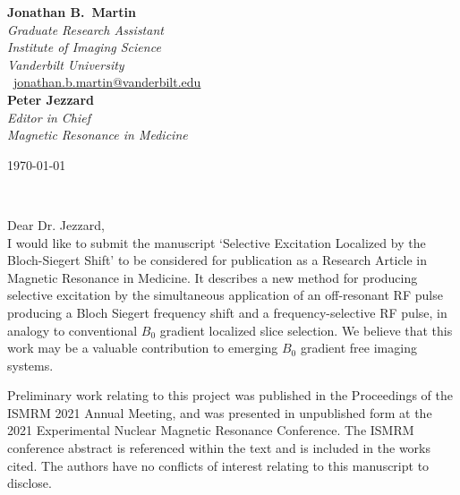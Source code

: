 \documentclass[11pt]{article}
\def\firstname{Jonathan B.}
\def\familyname{Martin}
\begin{document}
\sffamily   %
\raggedright%
{\bfseries \firstname~\familyname}\\[.35ex]
\small{\itshape%
Graduate Research Assistant\\
Institute of Imaging Science\\
Vanderbilt University\\}
\Letter~\href{mailto:jonathan.b.martin@vanderbilt.edu}{jonathan.b.martin@vanderbilt.edu}\\[2em]
{\bfseries Peter Jezzard}\\[.35ex]
\small{\itshape
Editor in Chief\\
Magnetic Resonance in Medicine\\[1em]}
%
\large
\hfill\begin{minipage}[t]{\textwidth} %
\raggedleft %
\today
\end{minipage}\\[2em]
\raggedright
Dear Dr. Jezzard,\\[1.5em]
%
I would like to submit the manuscript `Selective Excitation Localized by the Bloch-Siegert Shift' to be considered
for publication as a Research Article in Magnetic Resonance in Medicine. It describes a new method for producing selective excitation by the simultaneous application of an off-resonant RF pulse producing a Bloch Siegert frequency shift and a frequency-selective RF pulse, in analogy to conventional $B_0$ gradient localized slice selection.
We believe that this work may be a valuable contribution to emerging $B_0$ gradient free imaging systems. 

Preliminary work relating to this project was published in the Proceedings of the ISMRM 2021 Annual Meeting, and was presented in unpublished form at the 2021 Experimental Nuclear Magnetic Resonance Conference. The ISMRM conference abstract is referenced within the text and is included in the works cited. The authors have no conflicts of interest relating to this manuscript to disclose.
\end{document}
